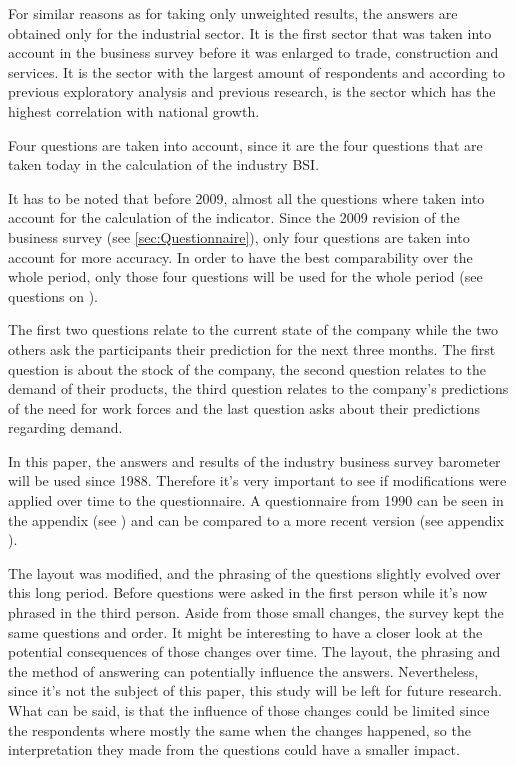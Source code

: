 \documentclass[12pt,a4paper,oneside]{book}
\begin{document}
For similar reasons as for taking only unweighted results, the answers are obtained only for the industrial sector.
It is the first sector that was taken into account in the business survey before it was enlarged to trade, construction and services. It is the sector with the largest amount of respondents and according to previous exploratory analysis and previous research, is the sector which has the highest correlation with national growth.

Four questions are taken into account, since it are the four questions that are taken today in the calculation of the industry BSI. 

It has to be noted that before 2009, almost all the questions where taken into account for the calculation of the indicator. Since the 2009 revision of the business survey (see \autoref{sec:Questionnaire}), only four questions are taken into account for more accuracy. In order to have the best comparability over the whole period, only those four questions will be used for the whole period (see questions on ).

The first two questions relate to the current state of the company while the two others ask the participants their prediction for the next three months.
The first question is about the stock of the company, 
the second question relates to the demand of their products, 
the third question relates to the company's predictions of the need for work forces and the last question asks about their predictions regarding demand.

In this paper, the answers and results of the industry business survey barometer will be used since 1988. Therefore it's very important to see if modifications were applied over time to the questionnaire.
A questionnaire from 1990 can be seen in the appendix (see ) and can be compared to a more recent version (see appendix ).

The layout was modified, and the phrasing of the questions slightly evolved over this long period. Before questions were asked in the first person while it's now phrased in the third person. Aside from those small changes, the survey kept the same questions and order.
It might be interesting to have a closer look at the potential consequences of those changes over time. The layout, the phrasing and the method of answering can potentially influence the answers. Nevertheless, since it's not the subject of this paper, this study will be left for future research.
What can be said, is that the influence of those changes could be limited since the respondents where mostly the same when the changes happened, so the interpretation they made from the questions could have a smaller impact.
\end{document}
